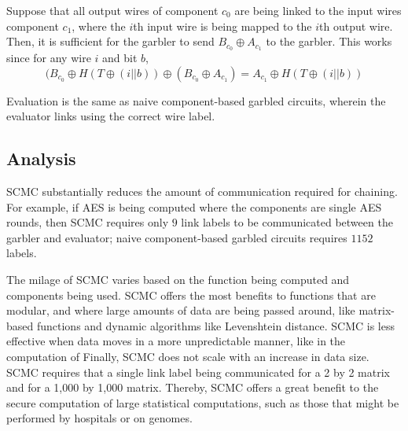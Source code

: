 Suppose that all output wires of component $c_0$ are being linked to the input wires component $c_1$, where the $i$th input wire is being mapped to the $i$th output wire. 
Then, it is sufficient for the garbler to send $B_{c_0} \oplus A_{c_1}$ to the garbler. 
This works since for any wire $i$ and bit $b$,
\begin{equation}
(B_{c_0} \oplus H(T \oplus (i || b)) \oplus (B_{c_0} \oplus A_{c_1}) = A_{c_1} \oplus H(T \oplus (i || b))
\end{equation}

Evaluation is the same as naive component-based garbled circuits, wherein the evaluator links using the correct wire label.

\subsection{Analysis}
SCMC substantially reduces the amount of communication required for chaining. 
For example, if AES is being computed where the components are single AES rounds, then SCMC requires only $9$ link labels to be communicated between the garbler and evaluator; naive component-based garbled circuits requires $1152$ labels. 

The milage of SCMC varies based on the function being computed and components being used. 
SCMC offers the most benefits to functions that are modular, and where large amounts of data are being passed around, like matrix-based functions and dynamic algorithms like Levenshtein distance. 
SCMC is less effective when data moves in a more unpredictable manner, like in the computation of 
Finally, SCMC does not scale with an increase in data size. 
SCMC requires that a single link label being communicated for a 2 by 2 matrix and for a 1,000 by 1,000 matrix. 
Thereby, SCMC offers a great benefit to the secure computation of large statistical computations, such as those that might be performed by hospitals or on genomes. 

